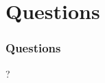 \documentclass[12pt]{beamer}
\begin{document}
\section{Questions}

\begin{frame}
\frametitle{Questions}
\begin{center}
\Huge{?}
\end{center}
\end{frame}

\printbibliography

 
\end{document}
